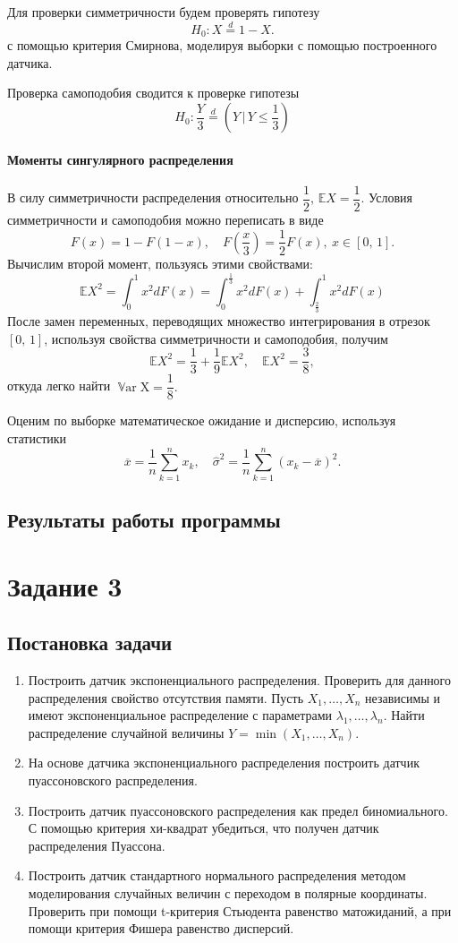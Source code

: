 \documentclass[16pt]{article}
\DeclareMathOperator*{\Var}{\mathbb{V}ar}
\begin{document}
Для проверки симметричности будем проверять гипотезу
$$H_0\colon X \overset{d}{=} 1 - X.$$
с помощью критерия Смирнова, моделируя выборки с помощью построенного датчика.

Проверка самоподобия сводится к проверке гипотезы
$$H_0\colon \dfrac{Y}{3} \overset{d}{=} \left(Y \, \bigg| \, Y \leq \dfrac13\right)$$

\paragraph{Моменты сингулярного распределения}
В силу симметричности распределения относительно $\dfrac12$, $\mathbb{E}X = \dfrac12$.
Условия симметричности и самоподобия можно переписать в виде
$$F(x) = 1 - F(1 - x), \quad F\left(\frac{x}{3}\right) = \frac12 F(x), \ x \in [0, \, 1].$$
Вычислим второй момент, пользуясь этими свойствами:
$$\mathbb{E}X^2 = \int_0^1x^2dF(x) = \int_0^{\frac13}x^2dF(x)+\int_\frac23^1 x^2dF(x)$$
После замен переменных, переводящих множество интегрирования в отрезок $[0,\, 1]$, используя свойства симметричности и самоподобия, получим
$$\mathbb{E}X^2 = \frac13 + \frac19\mathbb{E}X^2, \quad \mathbb{E}X^2 = \frac38,$$
откуда легко найти $\Var \mathrm{X} = \dfrac18.$

Оценим по выборке математическое ожидание и дисперсию, используя статистики $$\overline{x} = \dfrac{1}{n}\sum\limits_{k=1}^{n}x_k, \quad {\hat \sigma}^2 = \dfrac{1}{n}\sum\limits_{k=1}^{n}(x_k - \overline{x})^2.$$
\subsection{Результаты работы программы}

\section{Задание 3}
\subsection{Постановка задачи}
\begin{enumerate}
\item Построить датчик экспоненциального распределения. Проверить для данного распределения свойство отсутствия памяти. Пусть $X_1, \ldots, X_n$ независимы и имеют экспоненциальное распределение с параметрами $\lambda_1, \ldots, \lambda_n$. Найти распределение случайной величины $Y = \min(X_1, \ldots, X_n)$.
\item На основе датчика экспоненциального распределения построить датчик пуассоновского распределения.
\item Построить датчик пуассоновского распределения как предел биномиального. С помощью критерия хи-квадрат убедиться, что получен датчик распределения Пуассона.
\item Построить датчик стандартного нормального распределения методом моделирования случайных величин с переходом в полярные координаты. Проверить при помощи t-критерия Стьюдента равенство матожиданий, а при помощи критерия Фишера равенство дисперсий.
\end{enumerate}
\end{document}
